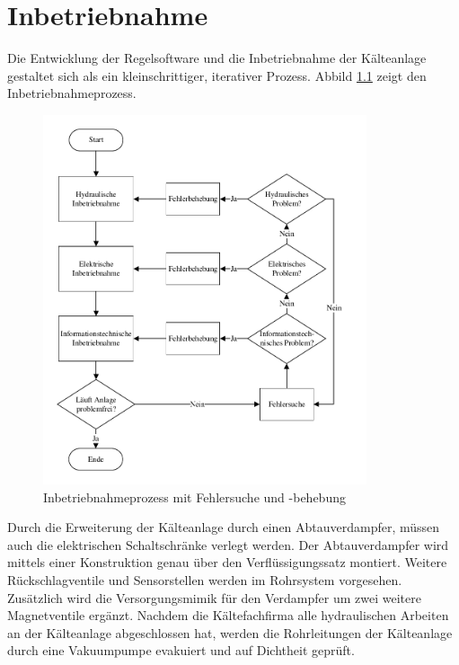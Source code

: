 \chapter{Inbetriebnahme}
\label{cha:Inbetriebnahme}

Die Entwicklung der Regelsoftware und die Inbetriebnahme der Kälteanlage gestaltet sich als ein kleinschrittiger, iterativer Prozess. Abbild \ref{fig:Inbetriebnahmeprozess} zeigt den Inbetriebnahmeprozess. 

\begin{figure}[htb]
\centering	
\includegraphics[width=0.850\textwidth]{Pictures/Inbetriebnahme/Ablauf.pdf}
\caption{Inbetriebnahmeprozess mit Fehlersuche und -behebung}
\label{fig:Inbetriebnahmeprozess}
\end{figure}

Durch die Erweiterung der Kälteanlage durch einen Abtauverdampfer, müssen  auch die elektrischen Schaltschränke verlegt werden. Der Abtauverdampfer wird mittels einer Konstruktion genau über den Verflüssigungssatz montiert. Weitere Rückschlagventile und Sensorstellen werden im Rohrsystem vorgesehen. Zusätzlich wird die Versorgungsmimik für den Verdampfer um zwei weitere Magnetventile ergänzt. Nachdem die Kältefachfirma alle hydraulischen Arbeiten an der Kälteanlage abgeschlossen hat, werden die Rohrleitungen der Kälteanlage durch eine Vakuumpumpe evakuiert und auf Dichtheit geprüft. 

